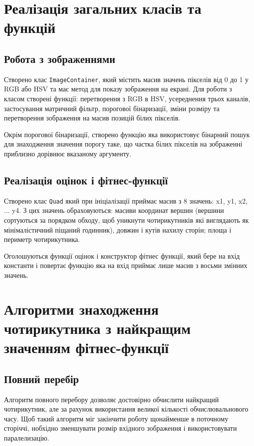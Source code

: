 \documentclass[a4paper,14pt]{report}
\def\code#1{\texttt{#1}}
\begin{document}
\section{Реалізація загальних класів та функцій}
\subsection{Робота з зображеннями}
Створено клас \code{ImageContainer}, який містить масив значень пікселів від 0 до 1 у RGB або HSV та має метод для показу зображення на екрані.
Для роботи з класом створені функції: перетворення з RGB в HSV, усереднення трьох каналів, застосування матричний фільтр, порогової бінаризації, зміни розміру та перетворення зображення на масив позицій білих пікселів.

Окрім порогової бінаризації, створено функцію яка використовує бінарний пошук для знаходження значення порогу таке, що частка білих пікселів на зображенні приблизно дорівнює вказаному аргументу.

\subsection{Реалізація оцінок і фітнес-функції}
Створено клас \code{Quad} який при ініціалізації приймає масив з 8 значень: x1, y1, x2, ... y4. 
З цих значень обраховуються: масиви координат вершин (вершини сортуються за порядком обходу, щоб уникнути чотирикутників які виглядають як мінімалістичний піщаний годинник), 
довжин і кутів нахилу сторін; площа і периметр чотирикутника.

Оголошуються функції оцінок і конструктор фітнес функції, який бере на вхід константи і повертає функцію яка на вхід приймає лише масив з восьми змінних значень.

\section{Алгоритми знаходження чотирикутника з найкращим значенням фітнес-функції}
\subsection{Повний перебір}
Алгоритм повного перебору дозволяє достовірно обчислити найкращий чотирикутник, але за рахунок використання великої кількості обчислювальнового часу. 
Щоб такий алгоритм міг закінчити роботу щонайменше в поточному сторіччі, нобхідно зменшувати розмір вхідного зображення і використовувати паралелизацію. 
\end{document}
